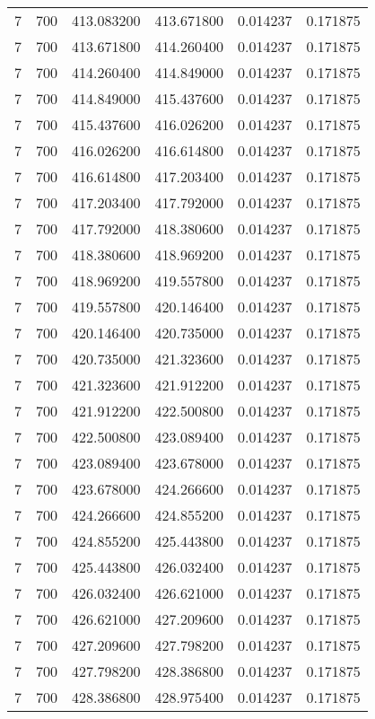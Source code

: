 \begin{longtable}{rrrrrr}
7 & 700 & 413.083200 & 413.671800 & 0.014237 & 0.171875 \\
7 & 700 & 413.671800 & 414.260400 & 0.014237 & 0.171875 \\
7 & 700 & 414.260400 & 414.849000 & 0.014237 & 0.171875 \\
7 & 700 & 414.849000 & 415.437600 & 0.014237 & 0.171875 \\
7 & 700 & 415.437600 & 416.026200 & 0.014237 & 0.171875 \\
7 & 700 & 416.026200 & 416.614800 & 0.014237 & 0.171875 \\
7 & 700 & 416.614800 & 417.203400 & 0.014237 & 0.171875 \\
7 & 700 & 417.203400 & 417.792000 & 0.014237 & 0.171875 \\
7 & 700 & 417.792000 & 418.380600 & 0.014237 & 0.171875 \\
7 & 700 & 418.380600 & 418.969200 & 0.014237 & 0.171875 \\
7 & 700 & 418.969200 & 419.557800 & 0.014237 & 0.171875 \\
7 & 700 & 419.557800 & 420.146400 & 0.014237 & 0.171875 \\
7 & 700 & 420.146400 & 420.735000 & 0.014237 & 0.171875 \\
7 & 700 & 420.735000 & 421.323600 & 0.014237 & 0.171875 \\
7 & 700 & 421.323600 & 421.912200 & 0.014237 & 0.171875 \\
7 & 700 & 421.912200 & 422.500800 & 0.014237 & 0.171875 \\
7 & 700 & 422.500800 & 423.089400 & 0.014237 & 0.171875 \\
7 & 700 & 423.089400 & 423.678000 & 0.014237 & 0.171875 \\
7 & 700 & 423.678000 & 424.266600 & 0.014237 & 0.171875 \\
7 & 700 & 424.266600 & 424.855200 & 0.014237 & 0.171875 \\
7 & 700 & 424.855200 & 425.443800 & 0.014237 & 0.171875 \\
7 & 700 & 425.443800 & 426.032400 & 0.014237 & 0.171875 \\
7 & 700 & 426.032400 & 426.621000 & 0.014237 & 0.171875 \\
7 & 700 & 426.621000 & 427.209600 & 0.014237 & 0.171875 \\
7 & 700 & 427.209600 & 427.798200 & 0.014237 & 0.171875 \\
7 & 700 & 427.798200 & 428.386800 & 0.014237 & 0.171875 \\
7 & 700 & 428.386800 & 428.975400 & 0.014237 & 0.171875 \\

\end{longtable}
